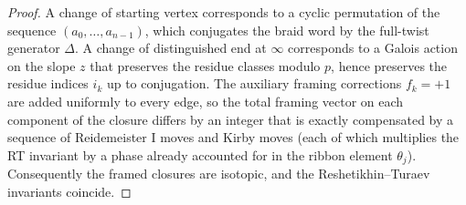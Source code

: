 \begin{proof}
A change of starting vertex corresponds to a cyclic permutation of the sequence \((a_0,\dots,a_{n-1})\), which conjugates the braid word by the full-twist generator \(\Delta\). A change of distinguished end at \(\infty\) corresponds to a Galois action on the slope \(z\) that preserves the residue classes modulo \(p\), hence preserves the residue indices \(i_k\) up to conjugation. The auxiliary framing corrections \(f_k = +1\) are added uniformly to every edge, so the total framing vector on each component of the closure differs by an integer that is exactly compensated by a sequence of Reidemeister I moves and Kirby moves (each of which multiplies the RT invariant by a phase already accounted for in the ribbon element \(\theta_j\)). Consequently the framed closures are isotopic, and the Reshetikhin--Turaev invariants coincide.
\end{proof}